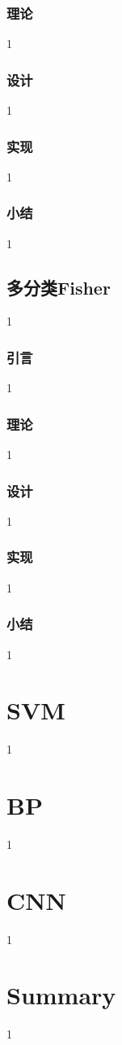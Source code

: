 \documentclass[UTF8, a4paper, 12pt]{report}
\begin{document}
		\subsection{理论}
1
		\subsection{设计}
1
		\subsection{实现}
1
		\subsection{小结}
1
	\section{多分类Fisher}
1
		\subsection{引言}
1
		\subsection{理论}
1
		\subsection{设计}
1
		\subsection{实现}
1
		\subsection{小结}
1		
\chapter{SVM}
1
\chapter{BP}
1
\chapter{CNN}
1
\chapter{Summary}
1
\end{document}

